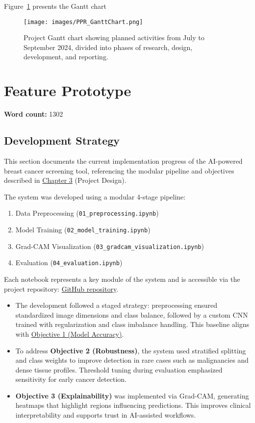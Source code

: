 \documentclass[12pt]{article}
\begin{document}
Figure~\ref{fig:gantt} presents the Gantt chart

\begin{figure}[H]
    \centering
    \texttt{[image: images/PPR\_GanttChart.png]}
    \caption{Project Gantt chart showing planned activities from July to September 2024, divided into phases of research, design, development, and reporting.}
    \label{fig:gantt}
\end{figure}

\newpage
\section{Feature Prototype}
\noindent\textbf{Word count:} 1302
\vspace{1em}

\subsection{Development Strategy}
This section documents the current implementation progress of the AI-powered breast cancer screening tool, referencing the modular pipeline and objectives described in \hyperref[chapter3]{Chapter 3} (Project Design).

The system was developed using a modular 4-stage pipeline:
\begin{enumerate}
    \item Data Preprocessing (\texttt{01\_preprocessing.ipynb})
    \item Model Training (\texttt{02\_model\_training.ipynb})
    \item Grad-CAM Visualization (\texttt{03\_gradcam\_visualization.ipynb})
    \item Evaluation (\texttt{04\_evaluation.ipynb})
\end{enumerate}

Each notebook represents a key module of the system and is accessible via the project repository: \href{https://github.com/justinlim00/FYP-Overview25/tree/main/FYP%20Project/FYP%20Project%20Code%20V1/notebooks}{GitHub repository}.

\begin{itemize}
    \item The development followed a staged strategy: preprocessing ensured standardized image dimensions and class balance, followed by a custom CNN trained with regularization and class imbalance handling. This baseline aligns with \hyperref[sec:objectives]{Objective 1 (Model Accuracy)}.
    
    \item To address \textbf{Objective 2 (Robustness)}, the system used stratified splitting and class weights to improve detection in rare cases such as malignancies and dense tissue profiles. Threshold tuning during evaluation emphasized sensitivity for early cancer detection.

    \item \textbf{Objective 3 (Explainability)} was implemented via Grad-CAM, generating heatmaps that highlight regions influencing predictions. This improves clinical interpretability and supports trust in AI-assisted workflows.
\end{itemize}
\end{document}
